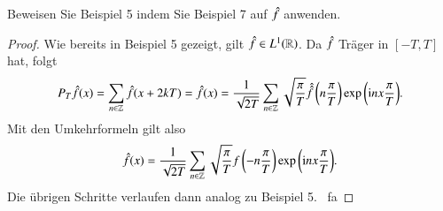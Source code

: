 
\begin{exercise}
  Beweisen Sie Beispiel 5 indem Sie Beispiel 7 auf $\hat{f}$ anwenden.
\end{exercise}

\begin{proof}
  Wie bereits in Beispiel 5 gezeigt, gilt $\hat{f} \in L^1(\mathbb{R})$.
  Da $\hat{f}$ Träger in $[-T,T]$ hat, folgt
  \begin{equation*}
    P_T \hat{f}(x)
    = \sum_{n \in \mathbb{Z}}{\hat{f}(x+2kT)}
    = \hat{f}(x)
    = \frac{1}{\sqrt{2T}} \sum_{n \in \mathbb{Z}}{\sqrt{\frac{\pi}{T}} \hat{\hat{f}}\left(n \frac{\pi}{T}\right)\exp\left(\mathrm{i} nx \frac{\pi}{T}\right)}.
  \end{equation*}
  Mit den Umkehrformeln gilt also
  \begin{equation*}
    \hat{f}(x)=\frac{1}{\sqrt{2T}}\sum_{n \in \mathbb{Z}}{\sqrt{\frac{\pi}{T}}f\left(-n\frac{\pi}{T}\right)\exp\left(\mathrm{i} n x\frac{\pi}{T}\right)}.
  \end{equation*}
  Die übrigen Schritte verlaufen dann analog zu Beispiel 5.
  \qedhere \ fa
\end{proof}
